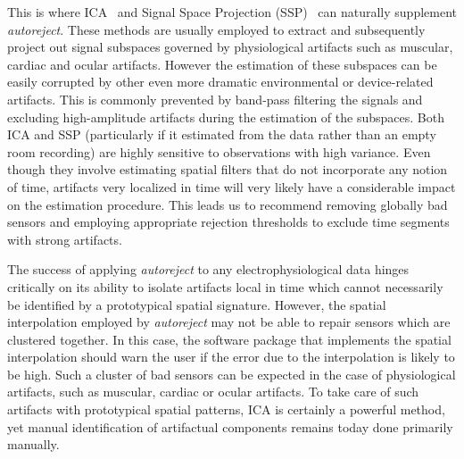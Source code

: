 This is where ICA~\citep{vigario1997extraction} and Signal Space Projection (SSP)~\citep{uusitalo1997signal} can naturally supplement \emph{autoreject}. These methods are usually employed to extract and subsequently project out signal subspaces governed by physiological artifacts such as muscular, cardiac and ocular artifacts. However the estimation of these subspaces can be easily corrupted by other even more dramatic environmental or device-related artifacts. This is commonly prevented by band-pass filtering the signals and excluding high-amplitude artifacts during the estimation of the subspaces. Both ICA and SSP (particularly if it estimated from the data rather than an empty room recording) are highly sensitive to observations with high variance. Even though they involve estimating spatial filters that do not incorporate any notion of time, artifacts very localized in time will very likely have a considerable impact on the estimation procedure. This leads us to recommend removing globally bad sensors and employing appropriate rejection thresholds to exclude time segments with strong artifacts. 

The success of applying \emph{autoreject} to any electrophysiological data hinges critically on its ability to isolate artifacts local in time which cannot necessarily be identified by a prototypical spatial signature. However, the spatial interpolation employed by \emph{autoreject} may not be able to repair sensors which are clustered together. In this case, the software package that implements the spatial interpolation should warn the user if the error due to the interpolation is likely to be high. Such a cluster of bad sensors can be expected in the case of physiological artifacts, such as muscular, cardiac or ocular artifacts. To take care of such artifacts with prototypical spatial patterns, ICA is certainly a powerful method, yet manual identification of artifactual components remains today done primarily manually.

